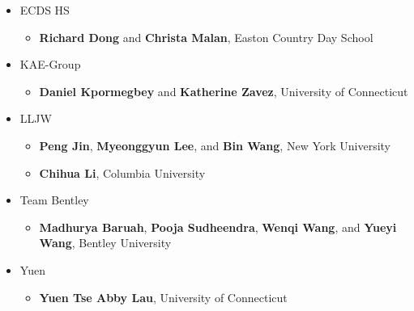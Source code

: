 {\small
\begin{itemize}
\item ECDS HS
  \begin{itemize}
  \item \textbf{Richard Dong} and \textbf{Christa Malan}, Easton Country Day School
  \end{itemize}
\item KAE-Group
  \begin{itemize}
  \item \textbf{Daniel Kpormegbey} and \textbf{Katherine Zavez}, University of Connecticut
  \end{itemize}
\item LLJW
  \begin{itemize}
  \item \textbf{Peng Jin}, \textbf{Myeonggyun Lee}, and \textbf{Bin Wang}, New York University
  \item \textbf{Chihua Li}, Columbia University
  \end{itemize}
\item Team Bentley
  \begin{itemize}
  \item \textbf{Madhurya Baruah},
    \textbf{Pooja Sudheendra},
    \textbf{Wenqi Wang}, and
    \textbf{Yueyi Wang}, Bentley University
  \end{itemize}
\item Yuen
  \begin{itemize}
  \item \textbf{Yuen Tse Abby Lau}, University of Connecticut
  \end{itemize}
\end{itemize}
}
